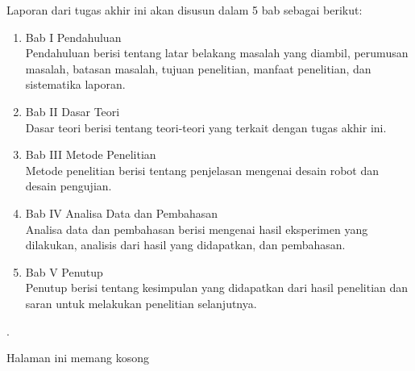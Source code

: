 \documentclass{article}
\begin{document}
Laporan dari tugas akhir ini akan disusun dalam 5 bab sebagai berikut:

\begin{enumerate}
 \item Bab I Pendahuluan\\
 Pendahuluan berisi tentang latar belakang masalah yang diambil, perumusan masalah, batasan masalah, tujuan penelitian, manfaat penelitian, dan sistematika laporan.
 
 \item Bab II Dasar Teori\\
 Dasar teori berisi tentang teori-teori yang terkait dengan tugas akhir ini.

 \item Bab III Metode Penelitian\\
 Metode penelitian berisi tentang penjelasan mengenai desain robot dan desain pengujian.
 
 \item Bab IV Analisa Data dan Pembahasan\\
 Analisa data dan pembahasan berisi mengenai hasil eksperimen yang dilakukan, analisis dari hasil yang didapatkan, dan pembahasan.
 
 \item Bab V Penutup\\
 Penutup berisi tentang kesimpulan yang didapatkan dari hasil penelitian dan saran untuk melakukan penelitian selanjutnya.\\

\end{enumerate}

\newpage
.\\
\vspace{200pt}

\hspace{75pt} Halaman ini memang kosong
\end{document}
